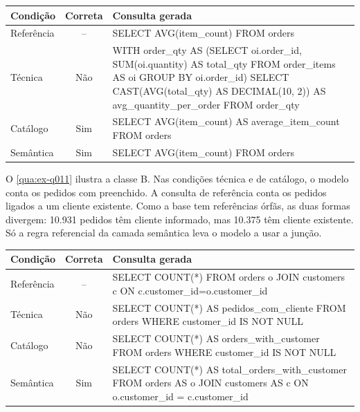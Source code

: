 \begin{quadro}[htb]
  \centering
  \caption{Q005: ``Qual é a média de quantidade de itens informada nos pedidos?''}
  \label{qua:ex-q005}
  \footnotesize
  \begin{tabularx}{\textwidth}{|l|c|X|}
    \hline
    \textbf{Condição} & \textbf{Correta} & \textbf{Consulta gerada} \\ \hline
    Referência & -- & \ttfamily SELECT AVG(item\_count) FROM orders \\ \hline
    Técnica & Não & \ttfamily WITH order\_qty AS (SELECT oi.order\_id,
      SUM(oi.quantity) AS total\_qty FROM order\_items AS oi GROUP BY
      oi.order\_id) SELECT CAST(AVG(total\_qty) AS DECIMAL(10, 2)) AS
      avg\_quantity\_per\_order FROM order\_qty \\ \hline
    Catálogo & Sim & \ttfamily SELECT AVG(item\_count) AS average\_item\_count FROM orders \\ \hline
    Semântica & Sim & \ttfamily SELECT AVG(item\_count) FROM orders \\ \hline
  \end{tabularx}
\end{quadro}

O \autoref{qua:ex-q011} ilustra a classe B. Nas condições técnica e de
catálogo, o modelo conta os pedidos com  preenchido. A
consulta de referência conta os pedidos ligados a um cliente existente.
Como a base tem referências órfãs, as duas formas divergem: 10.931 pedidos
têm cliente informado, mas 10.375 têm cliente existente. Só a regra
referencial da camada semântica leva o modelo a usar a junção.

\begin{quadro}[htb]
  \centering
  \caption{Q011: ``Quantos pedidos têm cliente associado?''}
  \label{qua:ex-q011}
  \footnotesize
  \begin{tabularx}{\textwidth}{|l|c|X|}
    \hline
    \textbf{Condição} & \textbf{Correta} & \textbf{Consulta gerada} \\ \hline
    Referência & -- & \ttfamily SELECT COUNT(*) FROM orders o JOIN customers
      c ON c.customer\_id=o.customer\_id \\ \hline
    Técnica & Não & \ttfamily SELECT COUNT(*) AS pedidos\_com\_cliente FROM
      orders WHERE customer\_id IS NOT NULL \\ \hline
    Catálogo & Não & \ttfamily SELECT COUNT(*) AS orders\_with\_customer FROM
      orders WHERE customer\_id IS NOT NULL \\ \hline
    Semântica & Sim & \ttfamily SELECT COUNT(*) AS total\_orders\_with\_customer
      FROM orders AS o JOIN customers AS c ON o.customer\_id = c.customer\_id \\ \hline
  \end{tabularx}
\end{quadro}

